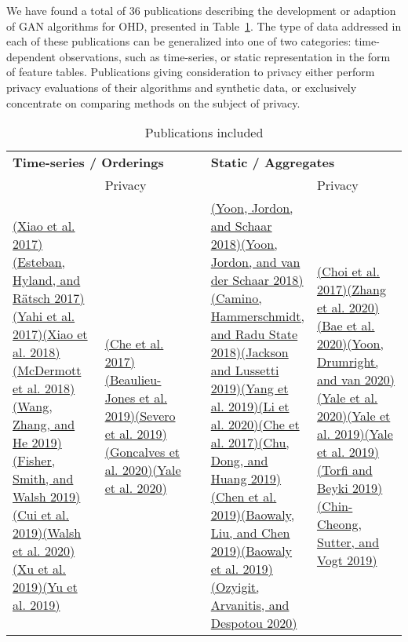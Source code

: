 \documentclass[10pt]{article}
\begin{document}
We have found a total of 36 publications describing the development or
adaption of GAN algorithms for OHD, presented in
Table~{\ref{tab:citeinc}}. The type of data addressed
in each of these publications can be generalized into one of two
categories: time-dependent observations, such as time-series, or static
representation in the form of feature tables. Publications giving
consideration to privacy either perform privacy evaluations of their
algorithms and synthetic data, or exclusively concentrate on comparing
methods on the subject of privacy.
\begin{table}
    \centering
        \caption{{Publications included}}\label{tab:citeinc}
    
        \begin{tabular}{@{}p{0.24\linewidth}p{0.24\linewidth}p{0.04\linewidth}p{0.24\linewidth}p{0.24\linewidth}@{}} \toprule
        
        \multicolumn{2}{l}{\textbf{Time-series / Orderings}} & {} & \multicolumn{2}{l}{\textbf{Static / Aggregates}} \\ 
        \cmidrule{1-2} \cmidrule{4-5}
        
        {} & Privacy & {} & {} & Privacy \\ \cmidrule{2}\cmidrule{5}
        
        \hyperref[csl:4]{(Xiao et al. 2017)}\hyperref[csl:5]{(Esteban, Hyland, and R{\"a}tsch 2017)}\hyperref[csl:6]{(Yahi et al. 2017)}\hyperref[csl:7]{(Xiao et al. 2018)}\hyperref[csl:8]{(McDermott et al. 2018)}\hyperref[csl:9]{(Wang, Zhang, and He 2019)}\hyperref[csl:10]{(Fisher, Smith, and Walsh 2019)}\hyperref[csl:11]{(Cui et al. 2019)}\hyperref[csl:12]{(Walsh et al. 2020)}\hyperref[csl:13]{(Xu et al. 2019)}\hyperref[csl:14]{(Yu et al. 2019)} & \hyperref[csl:15]{(Che et al. 2017)}\hyperref[csl:16]{(Beaulieu-Jones et al. 2019)}\hyperref[csl:17]{(Severo et al. 2019)}\hyperref[csl:18]{(Goncalves et al. 2020)}\hyperref[csl:19]{(Yale et al. 2020)} &
        {}
        & \hyperref[csl:20]{(Yoon, Jordon, and Schaar 2018)}\hyperref[csl:21]{(Yoon, Jordon, and van der Schaar 2018)}\hyperref[csl:22]{(Camino, Hammerschmidt, and {Radu State} 2018)}\hyperref[csl:23]{(Jackson and Lussetti 2019)}\hyperref[csl:24]{(Yang et al. 2019)}\hyperref[csl:25]{(Li et al. 2020)}\hyperref[csl:15]{(Che et al. 2017)}\hyperref[csl:26]{(Chu, Dong, and Huang 2019)}\hyperref[csl:27]{(Chen et al. 2019)}\hyperref[csl:28]{(Baowaly, Liu, and Chen 2019)}\hyperref[csl:29]{(Baowaly et al. 2019)}\hyperref[csl:30]{(Ozyigit, Arvanitis, and Despotou 2020)} & \hyperref[csl:31]{(Choi et al. 2017)}\hyperref[csl:32]{(Zhang et al. 2020)}\hyperref[csl:33]{(Bae et al. 2020)}\hyperref[csl:34]{(Yoon, Drumright, and van 2020)}\hyperref[csl:19]{(Yale et al. 2020)}\hyperref[csl:35]{(Yale et al. 2019)}\hyperref[csl:36]{(Yale et al. 2019)}\hyperref[csl:37]{(Torfi and Beyki 2019)}\hyperref[csl:38]{(Chin-Cheong, Sutter, and Vogt 2019)}\\ 
        \cmidrule{1-2} \cmidrule{4-5}
        

\end{tabular}
\end{table}
\end{document}
